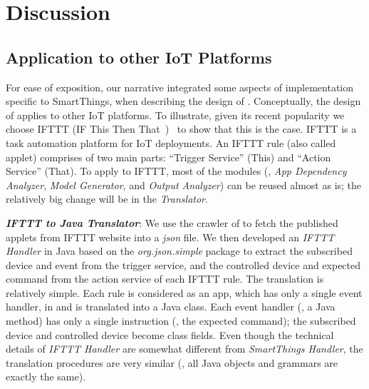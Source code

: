 \chapter{Discussion}
{\color{black}
\section{Application to other IoT Platforms}
For ease of exposition, our narrative integrated some aspects of
implementation specific to SmartThings, when describing the design of \sys. Conceptually,
the design of \sys applies to other IoT platforms. To illustrate, given its recent popularity we choose IFTTT (IF This Then That~\cite{iftttpage})~\cite{Liang:2015:SBI:2737095.2737115,Ur:2016:TPW:2858036.2858556,Mi:2017:ECI:3131365.3131369} to show that this is the case. IFTTT is a task automation platform for IoT deployments. An IFTTT rule (also called applet) comprises of two main parts: ``Trigger Service'' (This) and ``Action Service'' (That). To apply \sys to IFTTT, most of the modules (\ie, \textit{App Dependency Analyzer}, \textit{Model Generator}, and \textit{Output Analyzer}) can be reused almost as is; the relatively big change will be in the \textit{Translator}.


\textbf{\em IFTTT to Java Translator}: We use the crawler of \cite{Mi:2017:ECI:3131365.3131369} to fetch the published applets from IFTTT website into a \textit{json} file. We then developed an \textit{IFTTT Handler} in Java based on the \textit{org.json.simple} package to extract the subscribed device and event from the trigger service, and the controlled device and expected command from the action service of each IFTTT rule. {\color{black} The translation is relatively simple.} Each rule is considered as an app, which has only a single event handler, in \sys and is translated into a Java class. Each event handler (\ie, a Java method) has only a single instruction (\ie, the expected command); the subscribed device and controlled device become class fields. Even though the technical details of \textit{IFTTT Handler} are somewhat different from \textit{SmartThings Handler}, the translation procedures are very similar (\eg, all Java objects and grammars are exactly the same).

}
